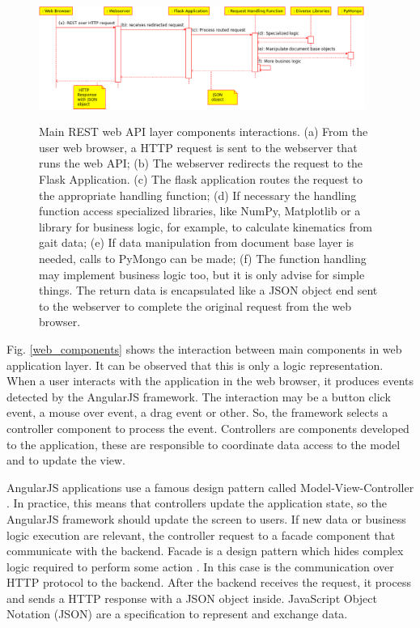 \documentclass[journal]{IEEEtran}
\begin{document}
\begin{figure}[tb]
	\centering
	{\includegraphics[width=0.95\textwidth]{./rest_web_api_components.eps}}
	\caption{Main REST web API layer components interactions.
		(a) From the user web browser, a HTTP request is sent to the  webserver that runs the web API;
		(b) The webserver redirects the request to the Flask Application.  
		(c) The flask application routes the request to the appropriate handling function;
		(d) If necessary the handling function access specialized libraries, like NumPy,
		Matplotlib or a library for business logic, for example,
		to calculate kinematics from gait data;
		(e) If data manipulation from document base layer is needed, calls to PyMongo can be made; 
		(f) The function handling may implement business logic too, but it is only advise for simple
		things. The return data is encapsulated like a JSON object end sent to the webserver to
		complete the original request from the web browser.
	}
	\label{rest_web_api_components}
\end{figure}

Fig. \ref{web_components} shows the interaction between  main components in web application layer.
It can be observed that this is only a logic representation.
When a user interacts with the application in the web browser, it produces events detected by the 
AngularJS framework. The interaction may be a button click event, a mouse over event, a drag event or
other. So, the framework selects a controller component to process the event.
Controllers are components developed to the application, these are responsible to coordinate
data access to the model and to update the view. 

AngularJS applications use a famous design pattern called Model-View-Controller \cite{Fowler2002}. 
In practice, this means that controllers update the application state, so the AngularJS framework
should update the screen to users.
If new data or business logic execution are relevant, the controller request to a facade component
that communicate with the backend. 
Facade is a design pattern which hides complex logic required to perform some action \cite{Fowler2002}. 
In this case is the communication over HTTP protocol to the backend.
After the backend receives the request, it process and sends a HTTP response with a JSON object inside.
JavaScript Object Notation (JSON) are a specification to represent and exchange data.
\end{document}
